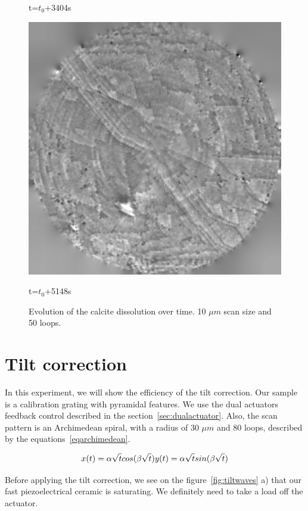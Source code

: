 \begin{figure}[!ht]
    \caption*{t=$t_0$+3404s} 
\endminipage\hfill
{}%
  	\includegraphics[width=\linewidth]{images/006_X10s50l10m_MOv2_1007.png}
    \caption*{t=$t_0$+5148s} 
\endminipage
\caption{Evolution of the calcite dissolution over time. 10 $\mu m$ scan size and 50 loops.} \label{fig:cdtotal}

\end{figure}


\section{Tilt correction}

In this experiment, we will show the efficiency of the tilt correction. Our sample is a calibration grating with pyramidal features. We use the dual actuators feedback control described in the section~\ref{sec:dualactuator}. Also, the scan pattern is an Archimedean spiral, with a radius of 30 $\mu m$ and 80 loops, described by the equations~\ref{eqarchimedean}.

\begin{equation}\label{eqarchimedean}
x(t)= \alpha \sqrt{t} cos(\beta \sqrt{t})\\
y(t)= \alpha \sqrt{t} sin(\beta \sqrt{t})
\end{equation}

Before applying the tilt correction, we see on the figure~\ref{fig:tiltwaves} a) that our fast piezoelectrical ceramic is saturating. We definitely need to take a load off the actuator.

